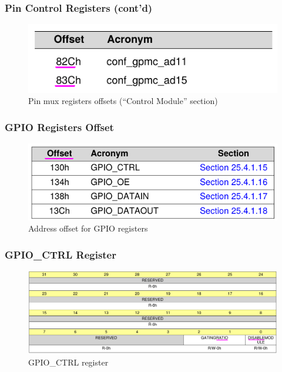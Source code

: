 \begin{frame}
  \frametitle{Pin Control Registers (cont'd)}
    \begin{figure}
      \centering
      \includegraphics[scale=0.5]{images/conf-offsets.png}
      \caption{Pin mux registers offsets (``Control Module'' section)}
  \end{figure}
\end{frame}

\begin{frame}
  \frametitle{GPIO Registers Offset}
    \begin{figure}
      \centering
      \includegraphics[scale=0.5]{images/gpio-registers-offset.png}
      \caption{Address offset for GPIO registers}
  \end{figure}
\end{frame}

\begin{frame}
  \frametitle{GPIO\_CTRL Register}
    \begin{figure}
      \centering
      \includegraphics[scale=0.3]{images/gpio-ctrl.png}
      \caption{GPIO\_CTRL register}
  \end{figure}
\end{frame}

